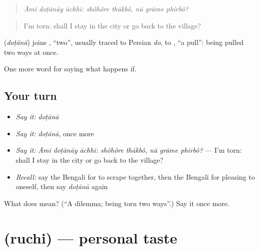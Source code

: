 \begin{quote}
\emph{Āmi doṭānāy āchhi: shôhôre thākbô, nā grāme phirbô?}
\end{quote}

\begin{quote}
I'm torn: shall I stay in the city or go back to the village?
\end{quote}

\begin{cousinweb}
\textbf{} (\emph{doṭānā}) joins , \textquotedblleft{}two\textquotedblright{}, usually traced to Persian \emph{do}, to , \textquotedblleft{}a pull\textquotedblright{}: being pulled two ways at once.
\end{cousinweb}

\begin{grammarlens}[title={What you've built}]
One more word for saying what happens if.
\end{grammarlens}

\subsection*{Your turn}
\begin{itemize}
\raggedright
  \item \emph{Say it:} \emph{doṭānā}
  \item \emph{Say it:} \emph{doṭānā}, once more
  \item \emph{Say it:} \emph{Āmi doṭānāy āchhi: shôhôre thākbô, nā grāme phirbô?} — I'm torn: shall I stay in the city or go back to the village?
  \item \emph{Recall:} say the Bengali for to scrape together, then the Bengali for pleasing to oneself, then say \emph{doṭānā} again
\end{itemize}

\begin{tcolorbox}[breakable,colback=teal!4,colframe=teal!35!black,title={Before you move on}]
What does  mean? (\textquotedblleft{}A dilemma; being torn two ways\textquotedblright{}.) Say it once more.
\end{tcolorbox}
\section[\texorpdfstring{\bn{রুচি} (ruchi)}{রুচি (ruchi)}]{ (ruchi) — personal taste}

\label{lesson:BN-C529-ruchi}



